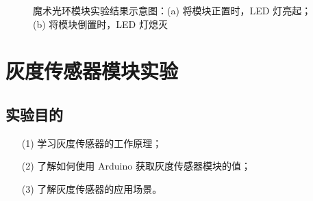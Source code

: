 \documentclass[UTF8, oneside]{ctexbook}
\begin{document}
\begin{figure}[h]
    \centering


    \centering
    \caption{魔术光环模块实验结果示意图：(a) 将模块正置时，LED 灯亮起；(b) 将模块倒置时，LED 灯熄灭}
    \label{s5_1}
    
\end{figure}


\chapter{灰度传感器模块实验}

\section{实验目的}
\begin{itemize}
    \item[(1)] 学习灰度传感器的工作原理；
    \item[(2)] 了解如何使用 Arduino 获取灰度传感器模块的值；
    \item[(3)] 了解灰度传感器的应用场景。   
\end{itemize}
\end{document}
